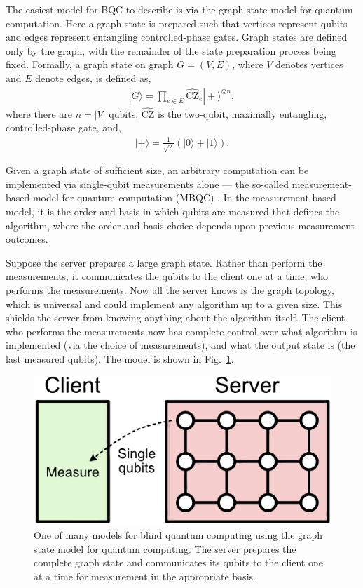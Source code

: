 The easiest model for BQC to describe is via the graph state model for quantum computation. Here a graph state is prepared such that vertices represent qubits and edges represent entangling controlled-phase gates. Graph states are defined only by the graph, with the remainder of the state preparation process being fixed. Formally, a graph state on graph $G=(V,E)$, where $V$ denotes vertices and $E$ denote edges, is defined as,
\begin{align}
	|G\rangle = \prod_{e\in E} \hat{\mathrm{CZ}}_e |+\rangle^{\otimes n},
\end{align}
where there are \mbox{$n=|V|$} qubits, $\hat{\mathrm{CZ}}$ is the two-qubit, maximally entangling, controlled-phase gate, and,
\begin{align}
	|+\rangle = \frac{1}{\sqrt{2}}(|0\rangle + |1\rangle).
\end{align}

Given a graph state of sufficient size, an arbitrary computation can be implemented via single-qubit measurements alone --- the so-called measurement-based model for quantum computation (MBQC) \cite{bib:Raussendorf03}. In the measurement-based model, it is the order and basis in which qubits are measured that defines the algorithm, where the order and basis choice depends upon previous measurement outcomes.

Suppose the server prepares a large graph state. Rather than perform the measurements, it communicates the qubits to the client one at a time, who performs the measurements. Now all the server knows is the graph topology, which is universal and could implement any algorithm up to a given size. This shields the server from knowing anything about the algorithm itself. The client who performs the measurements now has complete control over what algorithm is implemented (via the choice of measurements), and what the output state is (the last measured qubits). The model is shown in Fig.~\ref{fig:blind_MBQC}.

\begin{figure}[!htb]
	\centering
	\includegraphics[width=0.75\columnwidth]{figures/BQC_MBQC}
	\caption{One of many models for blind quantum computing using the graph state model for quantum computing. The server prepares the complete graph state and communicates its qubits to the client one at a time for measurement in the appropriate basis.} \label{fig:blind_MBQC}
\end{figure}